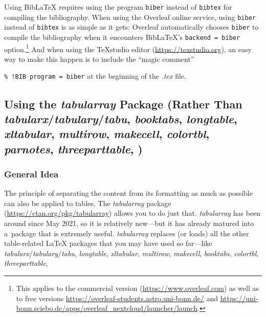 \documentclass[11pt, a4paper, oneside]{article}
\newlength{\baselinedist}
\newlength{\smalllinespacing}
\renewenvironment{quote}{%
	\par\list{}{%
		\baselineskip = \smalllinespacing%
		\leftmargin = \baselineskip%
		\rightmargin = \leftmargin%
		\topsep = 0.5\baselinedist plus 3ex
	}
	\item\relax%
}{%
	\endlist%
}
\theoremstyle{Plain}
\theoremstyle{Definition}
\theoremstyle{Remark}
\begin{document}
Using BibLaTeX requires using the program \verb|biber| instead of \verb|bibtex| for compiling the bibliography. When using the Overleaf online service, using \verb|biber| instead of \verb|bibtex| is as simple as it gets: Overleaf automatically chooses \verb|biber| to compile the bibliography when it encounters BibLaTeX's \verb|backend = biber| option.\footnote{This applies to the commercial version (\url{https://www.overleaf.com}) as well as to free versions \url{https://overleaf-students.astro.uni-bonn.de/} and \url{https://uni-bonn.sciebo.de/apps/overleaf_nextcloud/launcher/launch}.} And when using the TeXstudio editor (\url{https://texstudio.org}), an easy way to make this happen is to include the ``magic comment''
\begin{quote}
	\verb|% !BIB program = biber|
\end{quote}
at the beginning of the \textit{.tex} file.

\subsection{Using the \mbox{\textit{tabularray}} Package (Rather Than \mbox{\textit{tabularx}}\slash \mbox{\textit{tabulary}}\slash \mbox{\textit{tabu}}, \mbox{\textit{booktabs}}, \mbox{\textit{longtable}}, \mbox{\textit{xltabular}}, \mbox{\textit{multirow}}, \mbox{\textit{makecell}}, \mbox{\textit{colortbl}}, \mbox{\textit{parnotes}}, \mbox{\textit{threeparttable}}, \textellipsis\!)}

\subsubsection{General Idea}
The principle of separating the content from its formatting as much as possible can also be applied to tables. The \mbox{\textit{tabularray}} package (\url{https://ctan.org/pkg/tabularray}) allows you to do just that. \mbox{\textit{tabularray}} has been around since May 2021, so it is relatively new---but it has already matured into a~package that is extremely useful. \mbox{\textit{tabularray}} replaces (or loads) all the other table-related LaTeX packages that you may have used so far---like \mbox{\textit{tabularx}}\slash\mbox{\textit{tabulary}}\slash\mbox{\textit{tabu}}, \mbox{\textit{longtable}}, \mbox{\textit{xltabular}}, \mbox{\textit{multirow}}, \mbox{\textit{makecell}}, \mbox{\textit{booktabs}}, \mbox{\textit{colortbl}}, \mbox{\textit{threeparttable}}, \textellipsis
\end{document}
